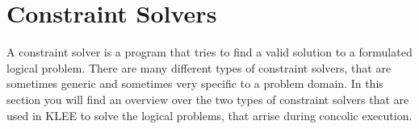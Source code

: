 \section{Constraint Solvers}\label{section:contraint_solvers}
A constraint solver is a program that tries to find a valid solution to a formulated logical problem. 
There are many different types of constraint solvers, that are sometimes generic and sometimes very specific to a problem domain.
In this section you will find an overview over the two types of constraint solvers that are used in KLEE to solve the logical problems, that arrise during concolic execution.


